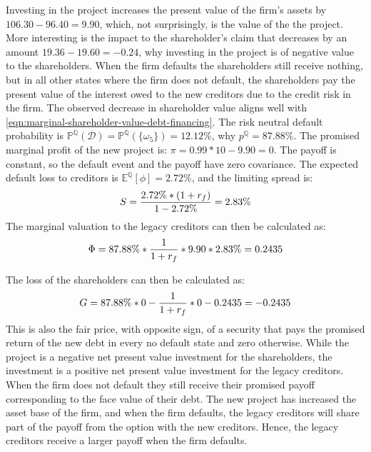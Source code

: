 \documentclass[../main.tex]{subfiles}
\begin{document}
        Investing in the project increases the present value of the firm's assets by $106.30 - 96.40 = 9.90$, which, not surprisingly, is the value of the the project.
        More interesting is the impact to the shareholder's claim that decreases by an amount $19.36 - 19.60 = -0.24$, why investing in the project is of negative value to the shareholders.
        When the firm defaults the shareholders still receive nothing, but in all other states where the firm does not default, the shareholders pay the present value of the interest owed to the new creditors due to the credit risk in the firm.
        The observed decrease in shareholder value aligns well with 
        \cref{eqn:marginal-shareholder-value-debt-financing}. 
        The risk neutral default probability is 
        $\mathbb{P}^{\mathbb{Q}}\left(\mathcal{D}\right) 
            = \mathbb{P}^{\mathbb{Q}}\left(\{\omega_{5}\}\right) 
            = 12.12\%$,
        why $p^{\mathbb{Q}} = 87.88\%$.
        The promised marginal profit of the new project is:
        $\pi = 0.99 * 10 - 9.90 = 0$.
        The payoff is constant, so the default event and the payoff have zero covariance. 
        The expected default loss to creditors is 
        $\mathbb{E}^{\mathbb{Q}}\left[\phi\right] = 2.72\%$,
        and the limiting spread is:
        \begin{equation}
            S 
            = \frac{
                2.72\% * (1 + r_{f})
            }{
                1 - 2.72\%
            } 
            = 2.83\%
        \end{equation}
        The marginal valuation to the legacy creditors can then be calculated as:
        \begin{equation}
            \Phi 
            = 87.88\% * \frac{1}{1+r_{f}}  * 9.90 * 2.83\% 
            = 0.2435
        \end{equation}

        The loss of the shareholders can then be calculated as: 
            \begin{align}
                G = 87.88\%*0 - \frac{1}{1+r_{f}} * 0 - 0.2435 = -0.2435
            \end{align}
        This is also the fair price, with opposite sign, 
        of a security that pays the promised return of the new debt in every no default state and zero otherwise. 
        While the project is a negative net present value investment for the shareholders,
        the investment is a positive net present value investment for the legacy creditors.
        When the firm does not default they still receive their promised payoff corresponding to the face value of their debt.
        The new project has increased the asset base of the firm, and when the firm defaults, 
        the legacy creditors will share part of the payoff from the option with the new creditors.
        Hence, the legacy creditors receive a larger payoff when the firm defaults. 
\end{document}
